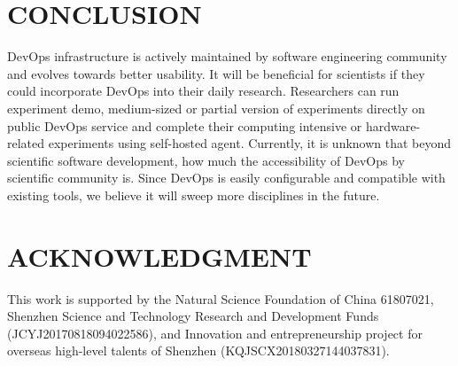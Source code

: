 \documentclass[10pt, conference, compsocconf]{IEEEtran}
\begin{document}
\section{CONCLUSION}
DevOps infrastructure is actively maintained by software engineering community and evolves towards better usability. It will be beneficial for scientists if they could incorporate DevOps into their daily research. Researchers can run experiment demo,  medium-sized or partial version of experiments directly on public DevOps service and complete their computing intensive or hardware-related experiments using self-hosted agent. Currently, it is unknown that beyond scientific software development, how much the accessibility of DevOps by scientific community is. Since DevOps is easily configurable and compatible with existing tools, we believe it will sweep more disciplines in the future.

\section{ACKNOWLEDGMENT}

This work is supported by the Natural Science Foundation of China 61807021, Shenzhen Science and Technology Research and Development Funds (JCYJ20170818094022586), and Innovation and entrepreneurship project for overseas high-level talents of Shenzhen (KQJSCX20180327144037831).




\end{document}
